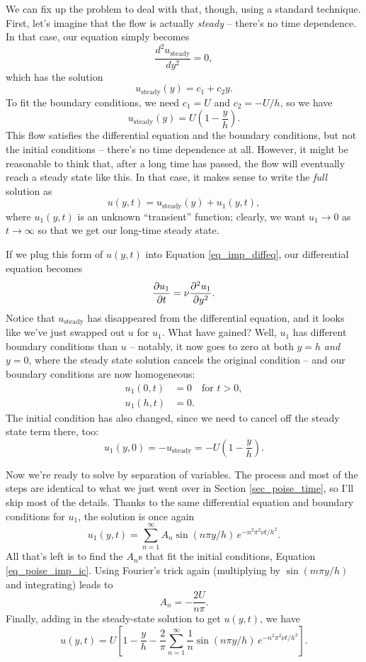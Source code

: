 We can fix up the problem to deal with that, though, using a standard technique.  First, let's imagine that the flow is actually \emph{steady} -- there's no time dependence.  In that case, our equation simply becomes
\[
\frac{d^2 u_\text{steady}}{dy^2} = 0,
\]
which has the solution
\[
u_\text{steady}(y) = c_1 + c_2 y.
\]
To fit the boundary conditions, we need $c_1 = U$ and $c_2 = -U/h$, so we have
\[
u_\text{steady}(y) = U \left( 1 - \frac{y}{h} \right).
\]
This flow satisfies the differential equation and the boundary conditions, but not the initial conditions -- there's no time dependence at all.  However, it might be reasonable to think that, after a long time has passed, the flow will eventually reach a steady state like this.  In that case, it makes sense to write the \emph{full} solution as
\[
u(y, t) = u_\text{steady}(y) + u_1(y, t),
\]
where $u_1(y, t)$ is an unknown ``transient'' function; clearly, we want $u_1 \to 0$ as $t \to \infty$ so that we get our long-time steady state. 

If we plug this form of $u(y,t)$ into Equation \ref{eq_imp_diffeq}, our differential equation becomes
\begin{equation}
\frac{\partial {u_1}}{\partial {t}} = \nu \frac{\partial^2 {u_1}}{\partial {y}^2}.
\end{equation}
Notice that $u_\text{steady}$ has disappeared from the differential equation, and it looks like we've just swapped out $u$ for $u_1$.  What have gained?  Well, $u_1$ has different boundary conditions than $u$ -- notably, it now goes to zero at both $y=h$ \emph{and} $y=0$, where the steady state solution cancels the original condition -- and our boundary conditions are now homogeneous:
\begin{align}
u_1(0, t) & = 0 \quad \text{for } t>0, \\
u_1(h, t) & = 0.
\end{align}
The initial condition has also changed, since we need to cancel off the steady state term there, too:
\begin{equation}
\label{eq_poise_imp_ic}
u_1(y, 0) = -u_\text{steady} = -U \left( 1 - \frac{y}{h} \right).
\end{equation}

Now we're ready to solve by separation of variables.  The process and most of the steps are identical to what we just went over in Section \ref{sec_poise_time}, so I'll skip most of the details.  Thanks to the same differential equation and boundary conditions for $u_1$, the solution is once again
\[
u_1(y, t) = \sum_{n=1}^\infty A_n \sin(n \pi y / h) \, e^{-n^2 \pi^2 \nu t / h^2}.
\]
All that's left is to find the $A_n$s that fit the initial conditions, Equation \ref{eq_poise_imp_ic}.  Using Fourier's trick again (multiplying by $\sin(m \pi y / h)$ and integrating) leads to 
\[
A_n = -\frac{2U}{n\pi}.
\]
Finally, adding in the steady-state solution to get $u(y, t)$, we have
\[
u(y, t) = U \left[ 1 - \frac{y}{h} - \frac{2}{\pi} \sum_{n=1}^\infty \frac{1}{n} \sin(n \pi y / h) \, e^{-n^2 \pi^2 \nu t / h^2} \right].
\]


